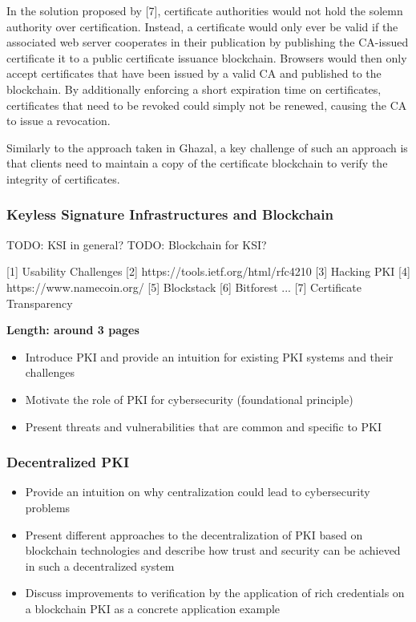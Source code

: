 In the solution proposed by [7], certificate authorities would not hold the solemn authority over certification. Instead, a certificate would only ever be valid if the associated web server cooperates in their publication by publishing the CA-issued certificate it to a public certificate issuance blockchain. Browsers would then only accept certificates that have been issued by a valid CA and published to the blockchain. By additionally enforcing a short expiration time on certificates, certificates that need to be revoked could simply not be renewed, causing the CA to issue a revocation.

Similarly to the approach taken in Ghazal, a key challenge of such an approach is that clients need to maintain a copy of the certificate blockchain to verify the integrity of certificates.


\subsubsection{Keyless Signature Infrastructures and Blockchain}
TODO: KSI in general?
TODO: Blockchain for KSI?


[1] Usability Challenges
[2] https://tools.ietf.org/html/rfc4210
[3] Hacking PKI
[4] https://www.namecoin.org/
[5] Blockstack
[6] Bitforest
...
[7] Certificate Transparency

\textbf{Length: around 3 pages}

\begin{itemize}
  \item Introduce PKI and provide an intuition for existing PKI systems and their challenges \cite{Straub2006}
  \item Motivate the role of PKI for cybersecurity (foundational principle)
  \item Present threats and vulnerabilities that are common and specific to PKI
\end{itemize}

\subsubsection{Decentralized PKI}

\begin{itemize}
  \item Provide an intuition on why centralization could lead to cybersecurity problems
  \item Present different approaches to the decentralization of PKI based on blockchain technologies and describe how trust and security can be achieved in such a decentralized system \cite{Ali2016} \cite{Dong2018} \cite{Dong2018a}
  \item Discuss improvements to verification by the application of rich credentials on a blockchain PKI as a concrete application example
\end{itemize}


